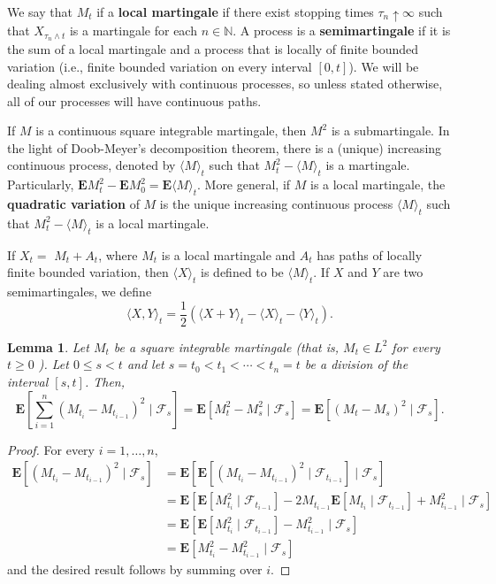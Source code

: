 \documentclass[twoside, 12pt]{book}
\numberwithin{equation}{chapter}
\newtheorem{lemma}[theorem]{Lemma}
\def\mN{{\mathbb N}}
\def\bE{{\mathbf E}}
\def\<{\langle}
\def\>{\rangle}
\def\geq{\geqslant}
\def\leq{\leqslant}
\begin{document}
	\medspace
	
	We say that $M_t$ if a {\bf local martingale} if there exist stopping times $\tau_n\uparrow \infty$ such that $X_{\tau_n\wedge t}$ is a martingale for each $n\in \mN$. A process is a {\bf semimartingale} if it is the sum of a local martingale and a process that is locally of finite bounded variation (i.e., finite bounded variation on every interval $[0,t]$). We will be dealing almost exclusively with continuous processes, so unless stated otherwise, all of our processes will have continuous paths. 
	
	If $M$ is a continuous square integrable martingale, then $M^2$ is a submartingale.  In the light of {Doob-Meyer's decomposition} theorem, there is a (unique) increasing continuous process, denoted by $\<M\>_t$ such that $M^2_t-\<M\>_t$ is a martingale. Particularly, $\bE M_t^2 - \bE M_0^2 = \bE \langle M \rangle_t$.  More general, if $M$ is a local martingale, the {\bf quadratic variation} of $M$ is the unique increasing continuous process $\<M\>_t$ such that $M^2_t-\<M\>_t$ is a local martingale.  
	
	 
	 If $X_t=$ $M_t+A_t$, where $M_t$ is a local martingale and $A_t$ has paths of locally finite bounded variation, then $\langle X\rangle_t$ is defined to be $\langle M\rangle_t$. If $X$ and $Y$ are two semimartingales, we define
	$$
	    \langle X, Y\rangle_t=\frac{1}{2}\left(\langle X+Y\rangle_t-\langle X\rangle_t-\langle Y\rangle_t\right). 
	$$
	
	\begin{lemma}
		Let $M_t$ be a square integrable martingale (that is, $M_t \in L^2$ for every $t \geq 0$ ). Let $0 \leq s<t$ and let $s=t_0<t_1<\cdots<t_n=t$ be a division of the interval $[s, t]$. Then,
		$$
		\bE\left[\sum_{i=1}^n\left(M_{t_i}-M_{t_{i-1}}\right)^2 \mid \mathcal{F}_s\right]=\bE\left[M_t^2-M_s^2 \mid \mathcal{F}_s\right]=\bE\left[\left(M_t-M_s\right)^2 \mid \mathcal{F}_s\right] .
		$$
	\end{lemma}
	\begin{proof}
		For every $i=1, \ldots, n$,
		$$
		\begin{aligned}
			\bE \left[ \left(M_{t_i}-M_{t_{i-1}}\right)^2 \mid \mathcal{F}_s\right] & =\bE\left[\bE \left[\left(M_{t_i}-M_{t_{i-1}}\right)^2 \mid \mathcal{F}_{t_{i-1}}\right] \mid \mathcal{F}_s\right] \\
			& =\bE\left[\bE\left[M_{t_i}^2 \mid \mathcal{F}_{t_{i-1}}\right]-2 M_{t_{i-1}} \bE\left[M_{t_i} \mid \mathcal{F}_{t_{i-1}}\right]+M_{t_{i-1}}^2 \mid \mathcal{F}_s\right] \\
			& =\bE\left[\bE\left[M_{t_i}^2 \mid \mathcal{F}_{t_{i-1}}\right]-M_{t_{i-1}}^2 \mid \mathcal{F}_s\right] \\
			& =\bE\left[M_{t_i}^2-M_{t_{i-1}}^2 \mid \mathcal{F}_s\right]
		\end{aligned}
		$$
		and the desired result follows by summing over $i$. 
	\end{proof}
	
\end{document}
